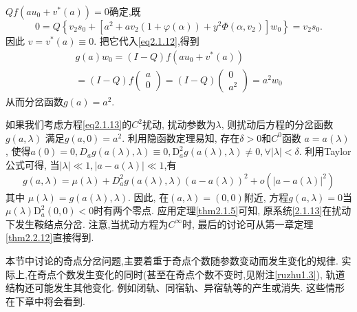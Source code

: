 \begin{example}
\(Q f\left(a u_{0}+v^{*}(a)\right)=0\)确定,既
\begin{equation*}
0=Q\left\{v_{2} s_{0}+\left[a^{2}+a v_{2}(1+\varphi(\alpha))+y^{2} \Phi\left(\alpha, v_{2}\right)\right] w_{0}\right\}=v_{2} s_{0}.
\end{equation*}
因此
\(v=v^{*}(a) \equiv 0\).
把它代入\eqref{eq2.1.12},得到
\begin{equation*}
\begin{array}{c}{g(a) w_{0}=(I-Q) f\left(a u_{0}+v^{*}(a)\right)} \\ {=(I-Q) f \left( \begin{array}{l}{a} \\ {0}\end{array}\right)=(I-Q) \left( \begin{array}{l}{0} \\ {a^{2}}\end{array}\right)=a^{2} w_{0}}\end{array}
\end{equation*}
从而分岔函数\(g(a)=a^{2}\).
\end{example}
\par
如果我们考虑方程\eqref{eq2.1.13}的\(C^{2}\)扰动,
扰动参数为\(\lambda\),
则扰动后方程的分岔函数\(g(a,\lambda)\)
满足\(g(a,0)=a^{2}\).
利用隐函数定理易知,
存在\(\delta>0\)和\(C^{0}\)函数
\(a=a(\lambda)\),
使得\(a(0)=0, D_{a} g(a(\lambda), \lambda) \equiv 0,
\mathrm{D}_{a}^{2} g(a(\lambda), \lambda) \neq 0, \forall|\lambda|<\delta\).
利用Taylor公式可得,
当\(|\lambda| \ll 1,|a-a(\lambda)| \ll 1 \),有
\begin{equation*}
g(a, \lambda)=\mu(\lambda)+D_{a}^{2} g(a(\lambda), \lambda)(a-a(\lambda))^{2}+o\left(|a-a(\lambda)|^{2}\right)
\end{equation*}
其中
\(\mu(\lambda)=g(a(\lambda), \lambda)\).
因此,
在\((a,\lambda)=(0,0)\)附近,
方程\(g(a,\lambda)=0\)当\(\mu(\lambda) \mathrm{D}_{a}^{2}(0,0)<0\)时有两个零点.
应用定理\ref{thm2.1.5}可知,
原系统\eqref{2.1.13}在扰动下发生鞍结点分岔.
注意,当扰动方程为\(C^{\infty}\)时,
最后的讨论可从第一章定理\ref{thm2.2.12}直接得到.
\begin{note}
  本节中讨论的奇点分岔问题,主要着重于奇点个数随参数变动而发生变化的规律.
  实际上,在奇点个数发生变化的同时(甚至在奇点个数不变时,见附注\ref{ruzhu1.3}),
  轨道结构还可能发生其他变化.
  例如闭轨、同宿轨、异宿轨等的产生或消失.
  这些情形在下章中将会看到.
\end{note}